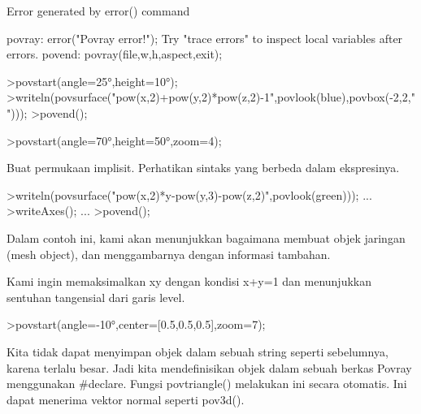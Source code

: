 \documentclass[a4paper,10pt]{article}
\begin{document}
\begin{eulernotebook}
\begin{eulercomment}
\begin{eulercomment}
\begin{euleroutput}
  Error generated by error() command
  
  povray:
      error("Povray error!");
  Try "trace errors" to inspect local variables after errors.
  povend:
      povray(file,w,h,aspect,exit); 
\end{euleroutput}
\begin{eulerprompt}
>povstart(angle=25°,height=10°); 
>writeln(povsurface("pow(x,2)+pow(y,2)*pow(z,2)-1",povlook(blue),povbox(-2,2,"")));
>povend();
\end{eulerprompt}
\begin{eulerprompt}
>povstart(angle=70°,height=50°,zoom=4);
\end{eulerprompt}
\begin{eulercomment}
Buat permukaan implisit. Perhatikan sintaks yang berbeda dalam
ekspresinya.
\end{eulercomment}
\begin{eulerprompt}
>writeln(povsurface("pow(x,2)*y-pow(y,3)-pow(z,2)",povlook(green))); ...
>writeAxes(); ...
>povend();
\end{eulerprompt}
\begin{eulercomment}
Dalam contoh ini, kami akan menunjukkan bagaimana membuat objek
jaringan (mesh object), dan menggambarnya dengan informasi tambahan.

Kami ingin memaksimalkan xy dengan kondisi x+y=1 dan menunjukkan
sentuhan tangensial dari garis level.
\end{eulercomment}
\begin{eulerprompt}
>povstart(angle=-10°,center=[0.5,0.5,0.5],zoom=7);
\end{eulerprompt}
\begin{eulercomment}
Kita tidak dapat menyimpan objek dalam sebuah string seperti
sebelumnya, karena terlalu besar. Jadi kita mendefinisikan objek dalam
sebuah berkas Povray menggunakan #declare. Fungsi povtriangle()
melakukan ini secara otomatis. Ini dapat menerima vektor normal
seperti pov3d().


\end{eulercomment}
\end{eulercomment}
\end{eulercomment}
\end{eulernotebook}
\end{document}

